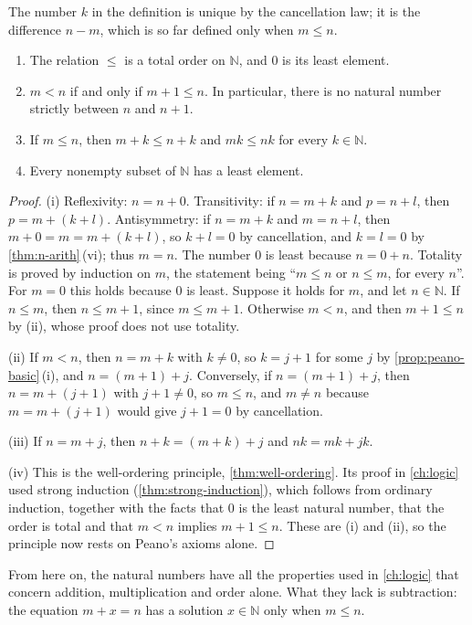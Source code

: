 The number $k$ in the definition is unique by the cancellation law; it is the difference $n-m$, which is so far defined only when $m\le n$.

\begin{theorem}
\label{thm:n-order}
\leavevmode
\begin{enumerate}
\item The relation $\le$ is a total order on $\mathbb N$, and $0$ is its least element.
\item $m<n$ if and only if $m+1\le n$. In particular, there is no natural number strictly between $n$ and $n+1$.
\item If $m\le n$, then $m+k\le n+k$ and $mk\le nk$ for every $k\in\mathbb N$.
\item Every nonempty subset of $\mathbb N$ has a least element.
\end{enumerate}
\end{theorem}

\begin{proof}
(i) Reflexivity: $n=n+0$. Transitivity: if $n=m+k$ and $p=n+l$, then $p=m+(k+l)$. Antisymmetry: if $n=m+k$ and $m=n+l$, then $m+0=m=m+(k+l)$, so $k+l=0$ by cancellation, and $k=l=0$ by \cref{thm:n-arith}\,(vi); thus $m=n$. The number $0$ is least because $n=0+n$. Totality is proved by induction on $m$, the statement being ``$m\le n$ or $n\le m$, for every $n$''. For $m=0$ this holds because $0$ is least. Suppose it holds for $m$, and let $n\in\mathbb N$. If $n\le m$, then $n\le m+1$, since $m\le m+1$. Otherwise $m<n$, and then $m+1\le n$ by (ii), whose proof does not use totality.

(ii) If $m<n$, then $n=m+k$ with $k\ne0$, so $k=j+1$ for some $j$ by \cref{prop:peano-basic}\,(i), and $n=(m+1)+j$. Conversely, if $n=(m+1)+j$, then $n=m+(j+1)$ with $j+1\ne0$, so $m\le n$, and $m\ne n$ because $m=m+(j+1)$ would give $j+1=0$ by cancellation.

(iii) If $n=m+j$, then $n+k=(m+k)+j$ and $nk=mk+jk$.

(iv) This is the well-ordering principle, \cref{thm:well-ordering}. Its proof in \cref{ch:logic} used strong induction (\cref{thm:strong-induction}), which follows from ordinary induction, together with the facts that $0$ is the least natural number, that the order is total and that $m<n$ implies $m+1\le n$. These are (i) and (ii), so the principle now rests on Peano's axioms alone.
\end{proof}

From here on, the natural numbers have all the properties used in \cref{ch:logic} that concern addition, multiplication and order alone. What they lack is subtraction: the equation $m+x=n$ has a solution $x\in\mathbb N$ only when $m\le n$.

